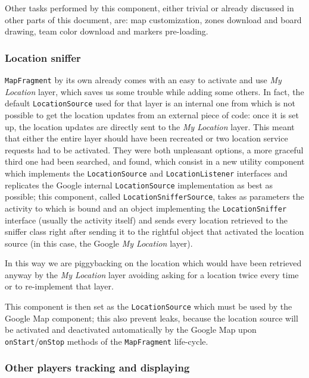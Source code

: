 			Other tasks performed by this component, either trivial or already discussed in other parts of this document, are: map customization, zones download and board drawing, team color download and markers pre-loading.
			
			\subsubsection{Location sniffer}
			
			\lstinline|MapFragment| by its own already comes with an easy to activate and use \emph{My Location} layer, which saves us some trouble while adding some others.
			In fact, the default \lstinline|LocationSource| used for that layer is an internal one from which is not possible to get the location updates from an external piece of code: once it is set up, the location updates are directly sent to the \emph{My Location} layer.
			This meant that either the entire layer should have been recreated or two location service requests had to be activated. They were both unpleasant options, a more graceful third one had been searched, and found, which consist in a new utility component which implements the \lstinline|LocationSource| and \lstinline|LocationListener| interfaces and replicates the Google internal \lstinline|LocationSource| implementation as best as possible; this component, called \lstinline|LocationSnifferSource|, takes as parameters the activity to which is bound and an object implementing the \lstinline|LocationSniffer| interface (usually the activity itself) and sends every location retrieved to the sniffer class right after sending it to the rightful object that activated the location source (in this case, the Google \emph{My Location} layer).
			
			In this way we are piggybacking on the location which would have been retrieved anyway by the \emph{My Location} layer avoiding asking for a location twice every time or to re-implement that layer.
			
			This component is then set as the \lstinline|LocationSource| which must be used by the Google Map component; this also prevent leaks, because the location source will be activated and deactivated automatically by the Google Map upon \lstinline|onStart|/\lstinline|onStop| methods of the \lstinline|MapFragment| life-cycle.
			
			\subsubsection{Other players tracking and displaying}
			
